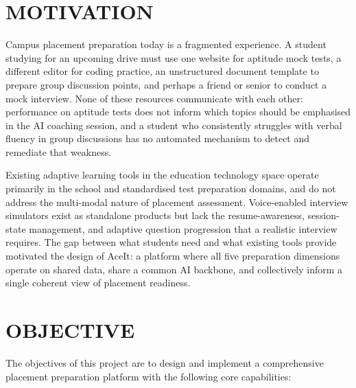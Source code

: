 \documentclass[12pt,a4paper]{report}
\begin{document}
\section{MOTIVATION}

Campus placement preparation today is a fragmented experience. A student studying for an upcoming drive must use one website for aptitude mock tests, a different editor for coding practice, an unstructured document template to prepare group discussion points, and perhaps a friend or senior to conduct a mock interview. None of these resources communicate with each other: performance on aptitude tests does not inform which topics should be emphasised in the AI coaching session, and a student who consistently struggles with verbal fluency in group discussions has no automated mechanism to detect and remediate that weakness.

Existing adaptive learning tools in the education technology space operate primarily in the school and standardised test preparation domains, and do not address the multi-modal nature of placement assessment. Voice-enabled interview simulators exist as standalone products but lack the resume-awareness, session-state management, and adaptive question progression that a realistic interview requires. The gap between what students need and what existing tools provide motivated the design of AceIt: a platform where all five preparation dimensions operate on shared data, share a common AI backbone, and collectively inform a single coherent view of placement readiness.

\section{OBJECTIVE}

The objectives of this project are to design and implement a comprehensive placement preparation platform with the following core capabilities:
\end{document}
